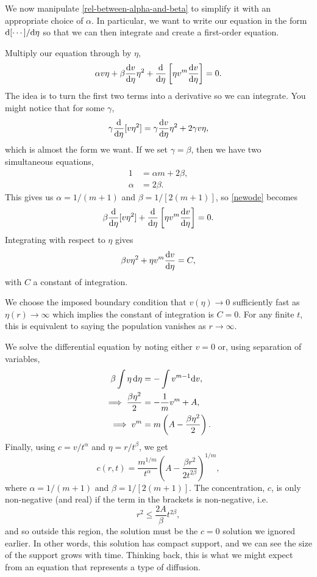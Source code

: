 \documentclass[main.tex]{subfiles}
\begin{document}
We now manipulate \cref{rel-between-alpha-and-beta} to simplify it with an appropriate choice of $\alpha$. In particular, we want to write our equation in the form $\fd{[\cdots]}{\eta}$ so that we can then integrate and create a first-order equation.

Multiply our equation through by $\eta$,
\begin{equation}
\label{newode}
\alpha v \eta + \beta \fd{v}{\eta} \eta^2 + \fd{}{\eta}\left[\eta v^m \fd{v}{\eta}\right]=0.
\end{equation}
The idea is to turn the first two terms into a derivative so we can integrate. You might notice that for some $\gamma$,
\begin{equation}
\gamma\fd{}{\eta}[v\eta^2] = \gamma \fd{v}{\eta} \eta^2 + 2\gamma v\eta, 
\end{equation}
which is almost the form we want. If we set $\gamma=\beta$, then we have two simultaneous equations,
\begin{align}
1 & = \alpha m + 2 \beta,\\
\alpha & = 2\beta.
\end{align}
This gives us $\alpha = 1/(m+1)$ and $\beta=1/[2(m+1)]$, so \cref{newode} becomes
\begin{equation}
\beta\fd{}{\eta}[v\eta^2] + \fd{}{\eta}\left[\eta v^m \fd{v}{\eta}\right] = 0.
\end{equation}
Integrating with respect to $\eta$ gives
\begin{equation}
\beta v\eta^2 + \eta v^m \fd{v}{\eta} = C,
\end{equation}
with $C$ a constant of integration.

We choose the imposed boundary condition that $v(\eta) \to 0$ sufficiently fast as $\eta(r) \to \infty$ which implies the constant of integration is $C=0$. For any finite $t$, this is equivalent to saying the population vanishes as $r\to \infty$.

We solve the differential equation by noting either $v=0$ or, using separation of variables,
\begin{align}
\beta \int \eta\,\mathrm{d}{\eta} &= - \int v^{m-1}\mathrm{d}{v},\\
\implies \frac{\beta \eta^2}{2} &=- \frac{1}{m}v^{m} + A,\\
\implies v^m &= m\left(A -  \frac{\beta\eta^2}{2}\right).
\end{align}
Finally, using $c= v/t^\alpha$ and $\eta= r/t^{\beta}$, we get 
\begin{equation}
c(r,t)= \frac{m^{1/m}}{t^{\alpha}}\left(A -  \frac{\beta r^2}{2t^{2\beta}}\right)^{1/m},
\end{equation}
where $\alpha = 1/(m+1)$ and $\beta=1/[2(m+1)]$.
The concentration, $c$, is only non-negative (and real) if the term in the brackets is non-negative, i.e.\
\begin{equation}
	r^2 \leq \frac{2A}{\beta}t^{2\beta},
\end{equation}
and so outside this region, the solution must be the $c=0$ solution we ignored earlier. In other words, this solution has compact support, and we can see the size of the support grows with time. Thinking back, this is what we might expect from an equation that represents a type of diffusion.
\end{document}
